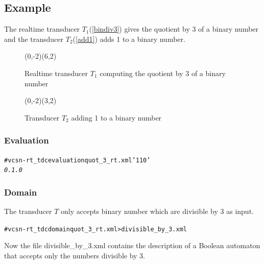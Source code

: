 \subsection{Example}

The realtime transducer $T_1$(\autoref{bindiv3}) gives the quotient by
3 of a binary number and the transducer $T_2$(\autoref{add1}) adds 1 to a
binary number.


\begin{figure}[h]
  \begin{center}
    \begin{VCPicture}{(0,-2)(6,2)}
  
\end{VCPicture}
\caption{Realtime transducer $T_1$ computing the quotient by 3 of a binary number}
\label{bindiv3}
  \end{center}
\end{figure}
\begin{figure}[h]
  \begin{center}
    \begin{VCPicture}{(0,-2)(3,2)}
 
\end{VCPicture}
\caption{Transducer $T_2$ adding 1 to a binary number}
\label{add1}
  \end{center}
\end{figure}

\subsubsection{Evaluation}
\begin{alltt}
# vcsn-rt_tdc evaluation quot_3_rt.xml '110'
\textit{0.1.0}
\end{alltt}

\subsubsection{Domain}
The transducer $T$ only accepts binary number which are divisible by 3
as input.
\begin{alltt}
# vcsn-rt_tdc domain quot_3_rt.xml > divisible_by_3.xml
\end{alltt}
Now the file divisible\_by\_3.xml contains the description of a Boolean
automaton that accepts only the numbers divisible by 3.

